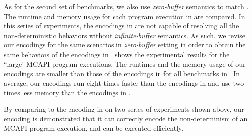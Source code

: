 As for the second set of benchmarks, we also use \textit{zero-buffer} semantics to match \cite{elwakil:padtad10}. The runtime and memory usage for each program execution in  are compared. In this series of experiments, the encodings in \cite{elwakil:padtad10} are not capable of resolving all the non-deterministic behaviors without \textit{infinite-buffer} semantics. As such, we revise our encodings for the same scenarios in \textit{zero-buffer} setting in order to obtain the same behaviors of the encodings in \cite{elwakil:padtad10}.  shows the experimental results for the ``large" MCAPI program executions. The runtimes and the memory usage of our encodings are smaller than those of the encodings in \cite{elwakil:padtad10} for all benchmarks in . In average, our encodings run eight times faster than the encodings in \cite{elwakil:padtad10} and use two times less memory than the encodings in \cite{elwakil:padtad10}.

By comparing to the encoding in \cite{elwakil:padtad10} on two series of experiments shown above, our encoding is demonstrated that it can correctly encode the non-determinism of an MCAPI program execution, and can be executed efficiently.


